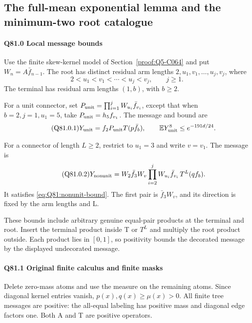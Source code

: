 \subsection{The full-mean exponential lemma and the minimum-two root catalogue}\label{proof:Q5-C081}
\paragraph{Q81.0 Local message bounds}\label{part:Q81:local-roles}
Use the finite skew-kernel model of Section~\ref{proof:Q5-C064} and put
\(W_n=A\bar f_{n-1}\). The root has distinct residual arm lengths
\(2,u_1,v_1,\ldots,u_j,v_j\), where
\[
2<u_1<v_1<\cdots<u_j<v_j,\qquad j\ge1.
\]
The terminal has residual arm lengths \((1,b)\), with \(b\ge2\).

For a unit connector, set \(P_{\rm unit}=\prod_{i=1}^jW_{u_i}\bar f_{v_i}\),
except that when \(b=2,j=1,u_1=5\), take
\(P_{\rm unit}=h_5f_{v_1}\). The message and bound are
\begin{equation}\tag{Q81.0.1}\label{eq:Q81:unit-role}
Y_{\rm unit}=f_2P_{\rm unit}T(p\bar f_b),\qquad
\mathbb E Y_{\rm unit}^8\le e^{-191d/24}.
\end{equation}

For a connector of length \(L\ge2\), restrict to \(u_1=3\) and write
\(v=v_1\). The message is
\begin{equation}\tag{Q81.0.2}\label{eq:Q81:nonunit-message}
Y_{\rm nonunit}=W_2\bar f_3W_v
\prod_{i=2}^jW_{u_i}\bar f_{v_i}\,T^L(qf_b).
\end{equation}
It satisfies \eqref{eq:Q81:nonunit-bound}. The first pair is
\(\bar f_3W_v\), and its direction is fixed by the arm lengths and L.

These bounds include arbitrary genuine equal-pair products at the terminal
and root. Insert the terminal product inside T or \(T^L\) and multiply
the root product outside. Each product lies in \([0,1]\), so positivity
bounds the decorated message by the displayed undecorated message.

\paragraph{Q81.1 Original finite calculus and finite masks}

Delete zero-mass atoms and use the measure on the remaining atoms. Since diagonal
kernel entries vanish, \(p(x),\allowbreak  q(x)\ge\mu(x)>0\). All finite tree
messages are positive: the all-equal labeling has positive mass and
diagonal edge factors one. Both A and T are positive operators.

